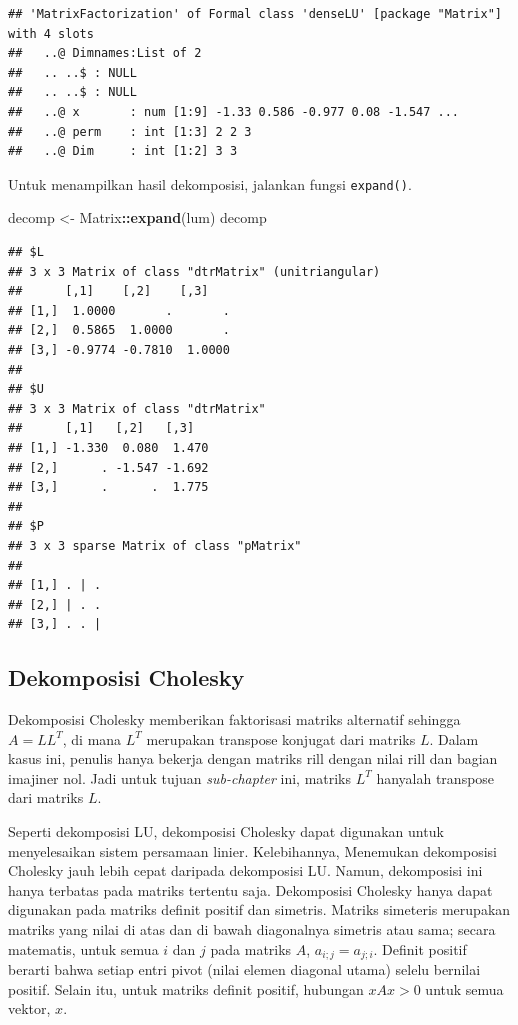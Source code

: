 \documentclass[
]{book}
\newenvironment{Shaded}{\begin{snugshade}}{\end{snugshade}}
\newcommand{\FunctionTok}[1]{\textcolor[rgb]{0.13,0.29,0.53}{\textbf{#1}}}
\newcommand{\NormalTok}[1]{#1}
\newcommand{\OtherTok}[1]{\textcolor[rgb]{0.56,0.35,0.01}{#1}}
\newcommand{\SpecialCharTok}[1]{\textcolor[rgb]{0.81,0.36,0.00}{\textbf{#1}}}
\theoremstyle{definition}
\theoremstyle{definition}
\theoremstyle{definition}
\theoremstyle{definition}
\theoremstyle{remark}
\begin{document}
\begin{verbatim}
## 'MatrixFactorization' of Formal class 'denseLU' [package "Matrix"] with 4 slots
##   ..@ Dimnames:List of 2
##   .. ..$ : NULL
##   .. ..$ : NULL
##   ..@ x       : num [1:9] -1.33 0.586 -0.977 0.08 -1.547 ...
##   ..@ perm    : int [1:3] 2 2 3
##   ..@ Dim     : int [1:2] 3 3
\end{verbatim}

Untuk menampilkan hasil dekomposisi, jalankan fungsi \texttt{expand()}.

\begin{Shaded}
\begin{Highlighting}[]
\NormalTok{decomp }\OtherTok{\textless{}{-}}\NormalTok{ Matrix}\SpecialCharTok{::}\FunctionTok{expand}\NormalTok{(lum)}
\NormalTok{decomp}
\end{Highlighting}
\end{Shaded}

\begin{verbatim}
## $L
## 3 x 3 Matrix of class "dtrMatrix" (unitriangular)
##      [,1]    [,2]    [,3]   
## [1,]  1.0000       .       .
## [2,]  0.5865  1.0000       .
## [3,] -0.9774 -0.7810  1.0000
## 
## $U
## 3 x 3 Matrix of class "dtrMatrix"
##      [,1]   [,2]   [,3]  
## [1,] -1.330  0.080  1.470
## [2,]      . -1.547 -1.692
## [3,]      .      .  1.775
## 
## $P
## 3 x 3 sparse Matrix of class "pMatrix"
##           
## [1,] . | .
## [2,] | . .
## [3,] . . |
\end{verbatim}

\hypertarget{dekomposisi-cholesky}{%
\subsection{Dekomposisi Cholesky}\label{dekomposisi-cholesky}}

Dekomposisi Cholesky memberikan faktorisasi matriks alternatif sehingga \(A = LL^T\), di mana \(L^T\) merupakan transpose konjugat dari matriks \(L\). Dalam kasus ini, penulis hanya bekerja dengan matriks rill dengan nilai rill dan bagian imajiner nol. Jadi untuk tujuan \emph{sub-chapter} ini, matriks \(L^T\) hanyalah transpose dari matriks \(L\).

Seperti dekomposisi LU, dekomposisi Cholesky dapat digunakan untuk menyelesaikan sistem persamaan linier. Kelebihannya, Menemukan dekomposisi Cholesky jauh lebih cepat daripada dekomposisi LU. Namun, dekomposisi ini hanya terbatas pada matriks tertentu saja. Dekomposisi Cholesky hanya dapat digunakan pada matriks definit positif dan simetris. Matriks simeteris merupakan matriks yang nilai di atas dan di bawah diagonalnya simetris atau sama; secara matematis, untuk semua \(i\) dan \(j\) pada matriks \(A\), \(a_{i;j}=a_{j;i}\). Definit positif berarti bahwa setiap entri pivot (nilai elemen diagonal utama) selelu bernilai positif. Selain itu, untuk matriks definit positif, hubungan \(xAx>0\) untuk semua vektor, \(x\).
\end{document}
